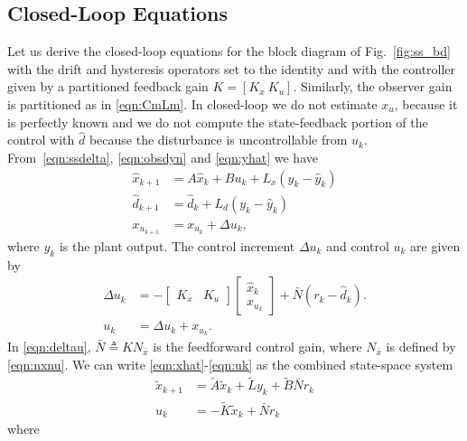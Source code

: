 \documentclass[twocolumn,twoside]{IEEEtran}
\newcommand{\x}{\ensuremath{x }\xspace}
\begin{document}
\subsection{Closed-Loop Equations}
Let us derive the closed-loop equations for the block diagram of Fig.~\ref{fig:ss_bd} with the drift and hysteresis operators set to the identity and with the controller given by a partitioned feedback gain ${K = [K_x\: K_u]}$. Similarly, the observer gain is partitioned as in \eqref{eqn:CmLm}.
In closed-loop we do not estimate $\x_u$, because it is perfectly known and we do not compute the state-feedback portion of the control with $\hat d$ because the disturbance is uncontrollable from $u_k$.  
From~\eqref{eqn:ssdelta}, \eqref{eqn:obsdyn} and \eqref{eqn:yhat} we have
\begin{align}
  \hat{\x}_{k+1} &= A \hat{x}_k + Bu_k + L_x(y_k - \hat{y}_k)\label{eqn:xhat}\\
  \hat{d}_{k+1}  &= \hat{d}_k  + L_d (y_k - \hat{y}_k) \label{eqn:dhat}\\
  x_{u_{k+1}}     &= x_{u_k}  + \Delta{u}_k,\label{eqn:xu}
\end{align}
where $y_k$ is the plant output. The control increment $\Delta u_k$ and control $u_k$ are given by
\begin{align}
  \Delta u_k &= -\begin{bmatrix}
    K_x & K_u
  \end{bmatrix}
  \begin{bmatrix}
    \hat{\x}_k \\ x_{u_k}
  \end{bmatrix}
  +
               \bar{N}(r_k - \hat{d}_k).\label{eqn:deltau}\\
  u_k &= \Delta u_k + x_{u_k}\label{eqn:uk}.
\end{align}
In \eqref{eqn:deltau}, $\bar{N}\triangleq KN_{\bar{x}}$ is the feedforward control gain, where $N_{\bar{x}}$ is defined by \eqref{eqn:nxnu}.
We can write \eqref{eqn:xhat}-\eqref{eqn:uk} as the combined state-space system
\begin{align}
\tilde{\x}_{k+1} &= \tilde{A}\tilde{\x}_k + \tilde{L}y_k + \tilde{B}\bar{N}r_k\label{eqn:cntrldyn}\\
u_k &= -\tilde{K}\tilde{\x}_k + \bar{N} r_k \label{eqn:ukx}
\end{align}
where
\end{document}
